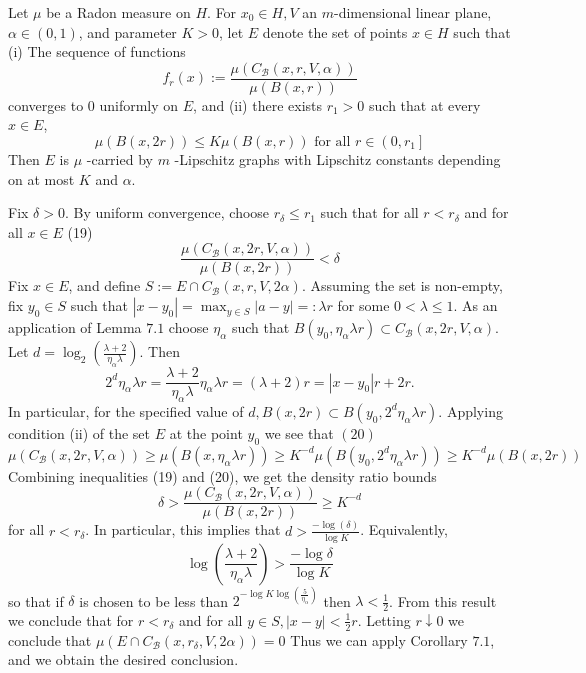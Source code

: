 \begin{lemma}[Lemma 7.2]
    Let $\mu$ be a Radon measure on $H$. For $x_{0} \in H, V$ an $m$-dimensional linear plane, $\alpha \in(0,1)$, and parameter $K>0$, let $E$ denote the set of points $x \in H$ such that
(i) The sequence of functions
$$
f_{r}(x):=\frac{\mu\left(C_{\mathcal{B}}(x, r, V, \alpha)\right)}{\mu(B(x, r))}
$$
converges to 0 uniformly on $E$, and
(ii) there exists $r_{1}>0$ such that at every $x \in E$,
$$
\mu(B(x, 2 r)) \leq K \mu(B(x, r)) \text { for all } r \in\left(0, r_{1}\right]
$$
Then $E$ is $\mu$ -carried by $m$ -Lipschitz graphs with Lipschitz constants depending on at most $K$ and $\alpha .$
\end{lemma}
\proof Fix $\delta>0$. By uniform convergence, choose $r_{\delta} \leq r_{1}$ such that for all $r<r_{\delta}$ and for all $x \in E$
(19)
$$
\frac{\mu\left(C_{\mathcal{B}}(x, 2 r, V, \alpha)\right)}{\mu(B(x, 2 r))}<\delta
$$
Fix $x \in E$, and define $S:=E \cap C_{\mathcal{B}}(x, r, V, 2 \alpha)$. Assuming the set is non-empty, fix $y_{0} \in S$ such that $\left|x-y_{0}\right|=\max _{y \in S}|a-y|=: \lambda r$ for some $0<\lambda \leq 1$. As an application of Lemma $7.1$ choose $\eta_{\alpha}$ such that $B\left(y_{0}, \eta_{\alpha} \lambda r\right) \subset C_{\mathcal{B}}(x, 2 r, V, \alpha) .$ Let $d=\log _{2}\left(\frac{\lambda+2}{\eta_{\alpha} \lambda}\right)$. Then
$$
2^{d} \eta_{\alpha} \lambda r=\frac{\lambda+2}{\eta_{\alpha} \lambda} \eta_{\alpha} \lambda r=(\lambda+2) r=\left|x-y_{0}\right| r+2 r .
$$
In particular, for the specified value of $d, B(x, 2 r) \subset B\left(y_{0}, 2^{d} \eta_{\alpha} \lambda r\right) .$ Applying condition (ii) of the set $E$ at the point $y_{0}$ we see that
$(20)$
$\mu\left(C_{\mathcal{B}}(x, 2 r, V, \alpha)\right) \geq \mu\left(B\left(x, \eta_{\alpha} \lambda r\right)\right) \geq K^{-d} \mu\left(B\left(y_{0}, 2^{d} \eta_{\alpha} \lambda r\right)\right) \geq K^{-d} \mu(B(x, 2 r))$
Combining inequalities (19) and (20), we get the density ratio bounds
$$
\delta>\frac{\mu\left(C_{\mathcal{B}}(x, 2 r, V, \alpha)\right)}{\mu(B(x, 2 r))} \geq K^{-d}
$$
for all $r<r_{\delta}$. In particular, this implies that $d>\frac{-\log (\delta)}{\log K}$. Equivalently,
$$
\log \left(\frac{\lambda+2}{\eta_{\alpha} \lambda}\right)>\frac{-\log \delta}{\log K}
$$
so that if $\delta$ is chosen to be less than $2^{-\log K \log \left(\frac{5}{\eta_{\alpha}}\right)}$ then $\lambda<\frac{1}{2}$. From this result we conclude that for $r<r_{\delta}$ and for all $y \in S,|x-y|<\frac{1}{2} r$. Letting $r \downarrow 0$ we conclude that $\mu\left(E \cap C_{\mathcal{B}}\left(x, r_{\delta}, V, 2 \alpha\right)\right)=0$
Thus we can apply Corollary $7.1$, and we obtain the desired conclusion. 
